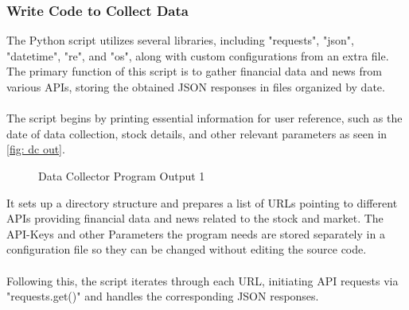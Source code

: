 \subsubsection{Write Code to Collect Data}\label{sec: dc code}
The Python script utilizes several libraries, including "requests", "json", "datetime", "re", and "os", along with custom configurations from an extra file. The primary function of this script is to gather financial data and news from various \ac{API}s, storing the obtained \ac{JSON} responses in files organized by date.\\
\\
The script begins by printing essential information for user reference, such as the date of data collection, stock details, and other relevant parameters as seen in \autoref{fig: dc out}.
\begin{figure}[H]
	\centering
	\caption{Data Collector Program Output 1}
	\label{fig: dc out}
\end{figure}
It sets up a directory structure and prepares a list of URLs pointing to different \ac{API}s providing financial data and news related to the stock and market. The \ac{API}-Keys and other Parameters the program needs are stored separately in a configuration file so they can be changed without editing the source code.\\
\\
Following this, the script iterates through each URL, initiating API requests via "requests.get()" and handles the corresponding \ac{JSON} responses. 

